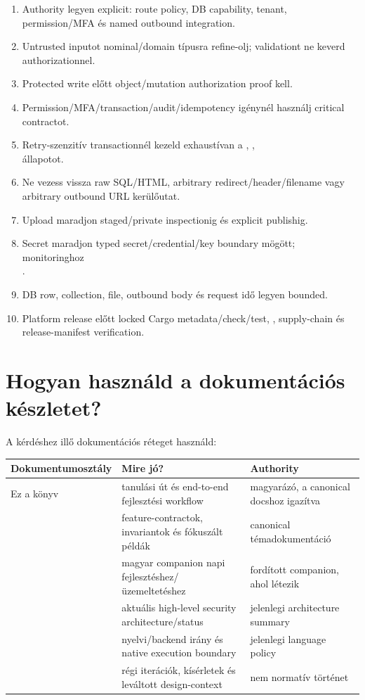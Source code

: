 \begin{enumerate}
  \item Authority legyen explicit: route policy, DB capability, tenant, permission/MFA és named outbound integration.
  \item Untrusted inputot nominal/domain típusra refine-olj; validationt ne keverd authorizationnel.
  \item Protected write előtt object/mutation authorization proof kell.
  \item Permission/MFA/transaction/audit/idempotency igénynél használj critical contractot.
  \item Retry-szenzitív transactionnél kezeld exhaustívan a , ,\\  állapotot.
  \item Ne vezess vissza raw SQL/HTML, arbitrary redirect/header/filename vagy arbitrary outbound URL kerülőutat.
  \item Upload maradjon staged/private inspectionig és explicit publishig.
  \item Secret maradjon typed secret/credential/key boundary mögött; monitoringhoz\\ .
  \item DB row, collection, file, outbound body és request idő legyen bounded.
  \item Platform release előtt locked Cargo metadata/check/test, , supply-chain és release-manifest verification.
\end{enumerate}


\section{Hogyan használd a dokumentációs készletet?}

A kérdéshez illő dokumentációs réteget használd:

\begin{longtable}{L{0.25\textwidth}L{0.31\textwidth}L{0.34\textwidth}}
\toprule
Dokumentumosztály & Mire jó? & Authority \\
\midrule
Ez a könyv & tanulási út és end-to-end fejlesztési workflow & magyarázó, a canonical docshoz igazítva \\
 & feature-contractok, invariantok és fókuszált példák & canonical témadokumentáció \\
 & magyar companion napi fejlesztéshez/üzemeltetéshez & fordított companion, ahol létezik \\
 & aktuális high-level security architecture/status & jelenlegi architecture summary \\
 & nyelvi/backend irány és native execution boundary & jelenlegi language policy \\
 & régi iterációk, kísérletek és leváltott design-context & nem normatív történet \\
\bottomrule
\end{longtable}

